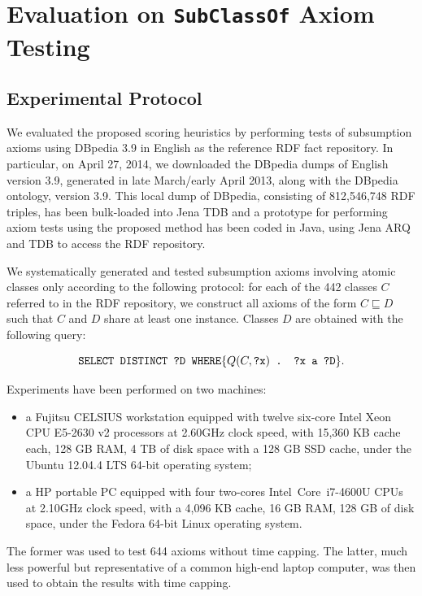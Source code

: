 \documentclass{llncs}
\begin{document}

\section{Evaluation on \texttt{SubClassOf} Axiom Testing}
\label{evaluation}


\subsection{Experimental Protocol}

We evaluated the proposed scoring heuristics by performing tests of subsumption
axioms using DBpedia 3.9 in English as the reference RDF fact repository.
In particular, on April 27, 2014, we downloaded the DBpedia dumps of English version 3.9,
generated in late March/early April 2013, along with the DBpedia ontology, version 3.9.
This local dump of DBpedia, consisting of 812,546,748 RDF triples,
has been bulk-loaded into Jena TDB and a prototype
for performing axiom tests using the proposed method has been coded in Java,
using Jena ARQ and TDB to access the RDF repository.

We systematically generated and tested subsumption axioms
involving atomic classes only according to the following protocol:
for each of the 442 classes $C$ referred to in the RDF repository,
we construct all axioms of the form $C \sqsubseteq D$ such that $C$ and $D$
share at least one instance. Classes $D$ are obtained with the following query: 

\[
  \mbox{\tt SELECT DISTINCT ?D WHERE} \{ Q(C, \mbox{\tt ?x}) \mbox{\tt\ . ?x a ?D} \}.
\]

Experiments have been performed on two machines:
\begin{itemize}
\item a Fujitsu CELSIUS workstation equipped
with twelve six-core Intel Xeon CPU E5-2630 v2 processors at 2.60GHz clock speed,
with 15,360 KB cache each, 128 GB RAM,
4 TB of disk space with a 128 GB SSD cache,
under the Ubuntu  12.04.4 LTS 64-bit operating system;
\item a HP  portable PC equipped
with four two-cores Intel\textregistered\ Core\texttrademark\ i7-4600U CPUs at 2.10GHz clock speed,
with a 4,096 KB cache, 16 GB RAM,
128 GB of disk space,
under the Fedora 64-bit Linux operating system.
\end{itemize}
The former was used to test 644 axioms without time capping.
The latter, much less powerful but representative of a common high-end laptop computer,
was then used to obtain the results with time capping.
\end{document}
